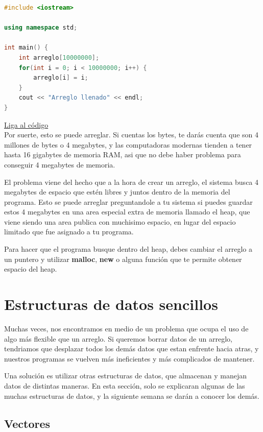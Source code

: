 \documentclass{article}
\begin{document}
\begin{lstlisting}[language=C++, caption=Faltas de memoria]
#include <iostream>

using namespace std;

int main() {
    int arreglo[10000000];
    for(int i = 0; i < 10000000; i++) {
        arreglo[i] = i;
    }
    cout << "Arreglo llenado" << endl;
}
\end{lstlisting}
\href{https://repl.it/@Jamesscn/Arreglo-no-arreglado}{Liga al código}\\

Por suerte, esto se puede arreglar. Si cuentas los bytes, te darás cuenta que son 4 millones de bytes o 4 megabytes, y las computadoras modernas tienden a tener hasta 16 gigabytes de memoria RAM, asi que no debe haber problema para conseguir 4 megabytes de memoria.

El problema viene del hecho que a la hora de crear un arreglo, el sistema busca 4 megabytes de espacio que estén libres y juntos dentro de la memoria del programa. Esto se puede arreglar preguntandole a tu sistema si puedes guardar estos 4 megabytes en una area especial extra de memoria llamado el heap, que viene siendo una area publica con muchisimo espacio, en lugar del espacio limitado que fue asignado a tu programa.

Para hacer que el programa busque dentro del heap, debes cambiar el arreglo a un puntero y utilizar \textbf{malloc}, \textbf{new} o alguna función que te permite obtener espacio del heap.

\section{Estructuras de datos sencillos}

Muchas veces, nos encontramos en medio de un problema que ocupa el uso de algo más flexible que un arreglo. Si queremos borrar datos de un arreglo, tendriamos que desplazar todos los demás datos que estan enfrente hacia atras, y nuestros programas se vuelven más ineficientes y más complicados de mantener.

Una solución es utilizar otras estructuras de datos, que almacenan y manejan datos de distintas maneras. En esta sección, solo se explicaran algunas de las muchas estructuras de datos, y la siguiente semana se darán a conocer los demás.

\subsection{Vectores}
\end{document}
